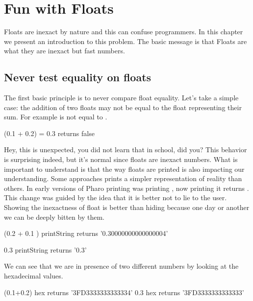 \documentclass[a4paper,10pt,twoside]{book}
\begin{document}
\fi
\sloppy

\chapter{Fun with Floats}

Floats are inexact by nature and this can confuse programmers. In this chapter we present 
an introduction to this problem. The basic message is that Floats are what they are inexact 
but fast numbers.


\section{Never test equality on floats}
The first basic principle is to never compare float equality. 
Let's take a simple case: the addition of two floats may not be equal to the float representing their
sum. For example  is not equal to .

\begin{code}{}
(0.1 + 0.2) = 0.3
	returns false
\end{code}

Hey, this is unexpected, you did not learn that in school, did you? This behavior is surprising indeed, but it's normal since floats are inexact numbers. What is important to understand is that the way floats are printed is also impacting our understanding. Some approaches prints a simpler representation of reality than others. In early versions of Pharo printing  was printing , now  printing it returns .
This change was guided by the idea that it is better not to lie to the user. Showing the inexactness of float is better than hiding because one day or another we can be deeply bitten by them. 

\begin{code}{}
(0.2 + 0.1 ) printString
	returns '0.30000000000000004' 

0.3 printString
	returns	'0.3'
\end{code}	

We can see that we are in presence of two different numbers by looking at the hexadecimal values. 

\begin{code}{}
(0.1+0.2) hex 
	returns '3FD3333333333334'
0.3 hex 
	returns '3FD3333333333333' 
\end{code}
\end{document}
